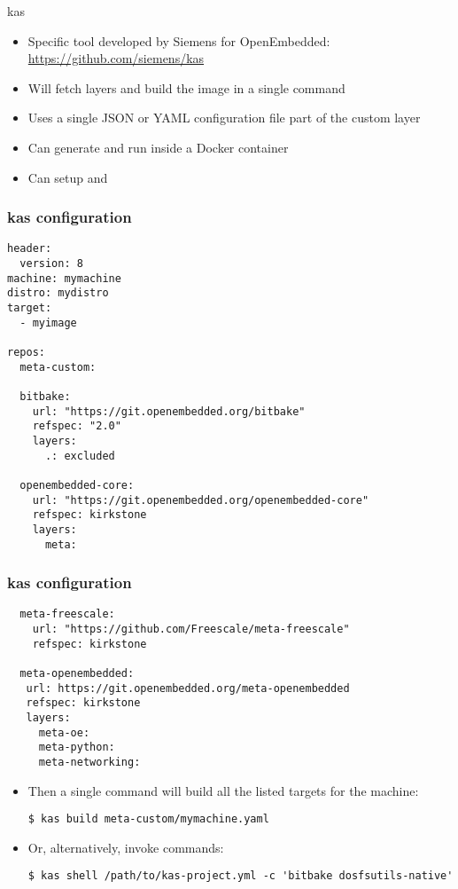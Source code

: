 \begin{frame}[fragile]{kas}
  \begin{itemize}
  \item Specific tool developed by Siemens for OpenEmbedded:
    \url{https://github.com/siemens/kas}
  \item Will fetch layers and build the image in a single command
  \item Uses a single JSON or YAML configuration file part of the
    custom layer
  \item Can generate and run inside a Docker container
  \item Can setup  and 
  \end{itemize}
\end{frame}

\begin{frame}[fragile]
  \frametitle{kas configuration}
  \begin{block}{}
  \fontsize{9}{9}\selectfont
  \begin{verbatim}
header:
  version: 8
machine: mymachine
distro: mydistro
target:
  - myimage

repos:
  meta-custom:

  bitbake:
    url: "https://git.openembedded.org/bitbake"
    refspec: "2.0"
    layers:
      .: excluded

  openembedded-core:
    url: "https://git.openembedded.org/openembedded-core"
    refspec: kirkstone
    layers:
      meta:
  \end{verbatim}
  \end{block}
\end{frame}

\begin{frame}[fragile]
  \frametitle{kas configuration}
  \fontsize{9}{9}\selectfont
  \begin{block}{}
  \begin{verbatim}
  meta-freescale:
    url: "https://github.com/Freescale/meta-freescale"
    refspec: kirkstone

  meta-openembedded:
   url: https://git.openembedded.org/meta-openembedded
   refspec: kirkstone
   layers:
     meta-oe:
     meta-python:
     meta-networking:
  \end{verbatim}
  \end{block}


  \begin{itemize}
  \item Then a single command will build all the listed targets for the
machine:

  \begin{verbatim}
$ kas build meta-custom/mymachine.yaml
  \end{verbatim}

  \item Or, alternatively, invoke  commands:

  \begin{verbatim}
$ kas shell /path/to/kas-project.yml -c 'bitbake dosfsutils-native'
  \end{verbatim}
  \end{itemize}
\end{frame}

